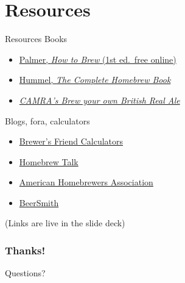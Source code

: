 \documentclass{beamer}
\begin{document}
\section{Resources}
\begin{frame}{Resources}
  Books
  \begin{itemize}
  \item \href{http://www.howtobrew.com/}{Palmer, \emph{How to Brew} (1st ed.\ free online)}
  \item
    \href{https://www.goodreads.com/book/show/11095467-the-complete-homebrew-beer-book}{Hummel, \emph{The Complete Homebrew Book}}
  \item \href{https://shop.camra.org.uk/brew-your-own-british-real-ale.html}{\emph{CAMRA's Brew your own British Real Ale}}
  \end{itemize}
  
  Blogs, fora, calculators
  \begin{itemize}
  \item\href{https://www.brewersfriend.com/stats/}{Brewer's Friend Calculators}
  \item\href{https://www.homebrewtalk.com/forum/}{Homebrew Talk}
  \item\href{https://www.homebrewersassociation.org/homebrew-recipes/}{American Homebrewers Association}
  \item\href{http://beersmith.com/beer-recipes/}{BeerSmith}
  \end{itemize}
  (Links are live in the slide deck)
\end{frame}

\begin{frame}
  \frametitle{Thanks!}
  Questions?
\end{frame}
\end{document}
